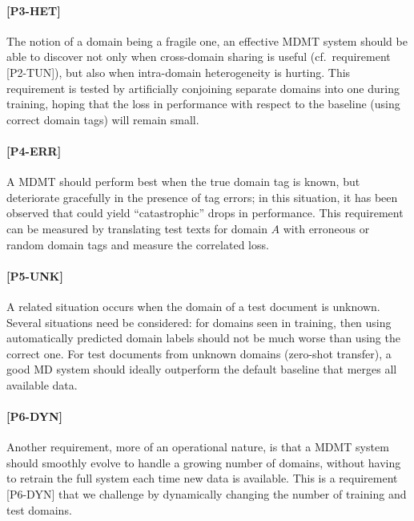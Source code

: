 \documentclass[11pt,a4paper]{article}
\newcommand{\fyTodo}[1]{\Todo[FY:]{\textcolor{orange}{#1}}}
\newcommand{\fyDone}[1]{\done[FY]\Todo[FY:]{\textcolor{orange}{#1}}}
\newcommand{\jcTodo}[1]{\Todo[JC:]{\textcolor{red}{#1}}}
\newcommand{\jcDone}[1]{\done[JC]\Todo[JC:]{\textcolor{red}{#1}}}
\begin{document}
\paragraph{[P3-HET]}
The notion of a domain being a fragile one, an effective MDMT system should be able to discover not only when cross-domain sharing is useful (cf.\ requirement [P2-TUN])\jcDone{what is P2.2?}, but also when intra-domain heterogeneity is hurting. This requirement is tested by artificially conjoining separate domains into one during training, hoping that the loss in performance with respect to the baseline (using correct domain tags) will remain small.

\paragraph{[P4-ERR]}
A MDMT should perform best when the true domain tag is known, but deteriorate gracefully in the presence of tag errors; in this situation, it has been observed that could yield ``catastrophic'' drops in performance\jcTodo{cite \cite{McCloskey89catastrophic}}. This requirement can be measured by translating test texts for domain $A$ with erroneous or random domain tags and measure the correlated loss.

\paragraph{[P5-UNK]}
A related situation occurs when the domain of a test document is unknown. Several situations need be considered: for domains seen in training, then using automatically predicted domain labels should not be much worse than using the correct one. For test documents from unknown domains (zero-shot transfer), a good MD system should ideally outperform the default baseline that merges all available data.\fyDone{Systems react to unknown domains}

\paragraph{[P6-DYN]}
Another requirement, more of an operational nature, is that a MDMT system should smoothly evolve to handle a growing number of domains, without having to retrain the full system each time new data is available. This is a requirement [P6-DYN] that we challenge by dynamically changing the number of training and test domains.
\end{document}
